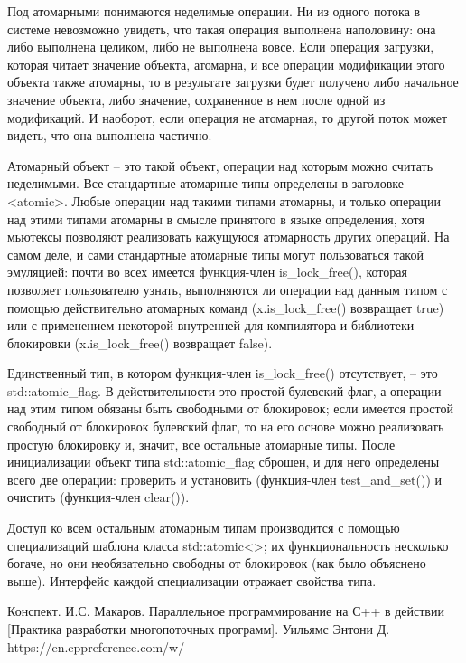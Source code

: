 \documentclass[a4paper,12pt]{article}	%
\begin{document}
	Под атомарными понимаются неделимые операции. Ни из одного потока в системе невозможно увидеть, что такая операция выполнена наполовину: она либо выполнена целиком, либо не выполнена вовсе. Если операция загрузки, которая читает значение объекта, атомарна, и все операции модификации этого объекта также атомарны, то в результате загрузки будет получено либо начальное значение объекта, либо значение, сохраненное в нем после одной из модификаций. И наоборот, если операция не атомарная, то другой поток может видеть, что она выполнена частично.
	 
	Атомарный объект -- это такой объект, операции над которым можно считать неделимыми. Все стандартные атомарные типы определены в заголовке <atomic>. Любые операции над такими типами атомарны, и только операции над этими типами атомарны в смысле принятого в языке определения, хотя мьютексы позволяют реализовать кажущуюся атомарность других операций. На самом деле, и сами стандартные атомарные типы могут пользоваться такой эмуляцией: почти во всех имеется функция-член  is\_lock\_free(), которая позволяет пользователю узнать, выполняются ли операции над данным типом с помощью действительно атомарных команд (x.is\_lock\_free() возвращает true) или с применением некоторой внутренней для компилятора и библиотеки блокировки (x.is\_lock\_free() возвращает false).
	 
	 Единственный тип, в котором функция-член is\_lock\_free() отсутствует, -- это  std::atomic\_flag. В действительности это простой булевский флаг, а операции над этим типом обязаны быть свободными от блокировок; если имеется простой свободный от блокировок булевский флаг, то на его основе можно реализовать простую блокировку и, значит, все остальные атомарные типы. После инициализации объект типа std::atomic\_flag сброшен, и для него определены всего две операции: проверить и установить (функция-член test\_and\_set()) и очистить (функция-член  clear()).

	Доступ ко всем остальным атомарным типам производится с помощью специализаций шаблона класса std::atomic<>; их функциональность несколько богаче, но они необязательно свободны от блокировок (как было объяснено выше). Интерфейс каждой специализации отражает свойства типа.

\newpage

	
 
	\begin{thebibliography}{}
	
		 Конспект. И.С. Макаров.
		 Параллельное программирование на С++ в действии [Практика разработки многопоточных программ]. Уильямс Энтони Д.
		 https://en.cppreference.com/w/
		
	\end{thebibliography}
\end{document}
